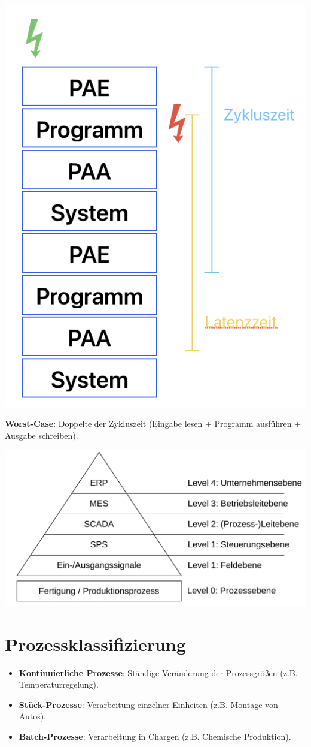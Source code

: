 \documentclass[9pt, a3paper, landscape]{article}
\newcommand{\algo}[1]{\textbf{\textcolor{blue!60!black}{#1}}}
\newcommand{\datastruct}[1]{\textbf{\textcolor{red!60!black}{#1}}}
\begin{document}
\begin{multicols*}{4}
\begin{itemize}
\begin{center}
    \includegraphics[width=0.5\linewidth]{assets/ATT.png}
\end{center}

\algo{Worst-Case}: Doppelte der Zykluszeit (Eingabe lesen + Programm ausführen + Ausgabe schreiben).

\begin{center}
    \includegraphics[width=0.8\linewidth]{assets/ATP.png}
\end{center}

\section{Prozessklassifizierung}

\begin{itemize}
    \item \datastruct{Kontinuierliche Prozesse}: Ständige Veränderung der Prozessgrößen (z.B. Temperaturregelung).
    \item \datastruct{Stück-Prozesse}: Verarbeitung einzelner Einheiten (z.B. Montage von Autos).
    \item \datastruct{Batch-Prozesse}: Verarbeitung in Chargen (z.B. Chemische Produktion).
\end{itemize}


\end{itemize}
\end{multicols*}
\end{document}
